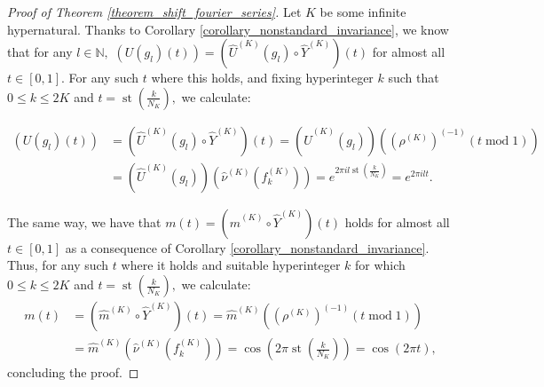 \documentclass{amsart}
\theoremstyle{definition}
\theoremstyle{remark}
\def \St{\operatorname{st}}
\def \HNU{\hat{\nu}}
\def \HU{\hat{U}}
\def \Hm{\hat{m}}
\begin{document}
\begin{proof}[Proof of Theorem \ref{theorem_shift_fourier_series}]
	Let $K$ be some infinite hypernatural. Thanks to Corollary \ref{corollary_nonstandard_invariance}, we know that for any $l\in\mathbb{N},$ $(U(g_l)(t))=(\HU^{(K)}(g_l)\circ \hat{Y}^{(K)})(t)$ for almost all $t\in[0,1]$. For any such $t$ where this holds, and fixing hyperinteger $k$ such that $0\leq k\leq 2K$ and $t=\St(\frac{k}{N_K}),$ we calculate:
	
	\begin{align*}
		(U(g_l)(t))&=(\HU^{(K)}(g_l)\circ \hat{Y}^{(K)})(t)=(\HU^{(K)}(g_l))((\rho^{(K)})^{(-1)}(t\operatorname{mod} 1))\\
		&=(\HU^{(K)}(g_l))(\HNU^{(K)}(f_k^{(K)}))=e^{2\pi i l \St(\frac{k}{N_K})}=e^{2\pi i l t}.
	\end{align*}
	
	The same way, we have that $m(t)=(\Hm^{(K)}\circ \hat{Y}^{(K)})(t)$ holds for almost all $t\in[0,1]$ as a consequence of Corollary \ref{corollary_nonstandard_invariance}. Thus, for any such $t$ where it holds and suitable hyperinteger $k$ for which $0\leq k\leq 2K$ and $t=\St(\frac{k}{N_K}),$ we calculate:
	\begin{align*}
		m(t)&=(\Hm^{(K)}\circ \hat{Y}^{(K)})(t)=\Hm^{(K)}((\rho^{(K)})^{(-1)}(t\operatorname{mod} 1))\\
		&=\Hm^{(K)}(\HNU^{(K)}(f_k^{(K)}))=\cos(2\pi\St(\frac{k}{N_K}))=\cos(2\pi t),
	\end{align*}
	concluding the proof.
\end{proof}
	
\end{document}

